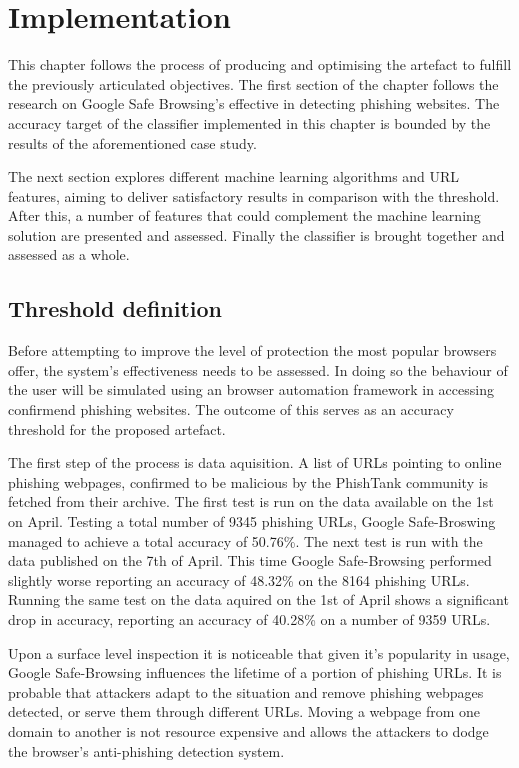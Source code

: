 
\chapter{Implementation}
This chapter follows the process of producing and optimising the artefact to fulfill the previously articulated objectives. The first section of the chapter follows the research on Google Safe Browsing's effective in detecting phishing websites. The accuracy target of the classifier implemented in this chapter is bounded by the results of the aforementioned case study. 

The next section explores different machine learning algorithms and URL features, aiming to deliver satisfactory results in comparison with the threshold. After this, a number of features that could complement the machine learning solution are presented and assessed. Finally the classifier is brought together and assessed as a whole.

\section{Threshold definition}
Before attempting to improve the level of protection the most popular browsers offer, the system's effectiveness needs to be assessed. In doing so the behaviour of the user will be simulated using an browser automation framework in accessing confirmend phishing websites. The outcome of this serves as an accuracy threshold for the proposed artefact.

The first step of the process is data aquisition. A list of URLs pointing to online phishing webpages, confirmed to be malicious by the PhishTank community is fetched from their archive. The first test is run on the data available on the 1st on April. Testing a total number of 9345 phishing URLs, Google Safe-Broswing managed to achieve a total accuracy of 50.76\%. 
The next test is run with the data published on the 7th of April. This time Google Safe-Browsing performed slightly worse reporting an accuracy of 48.32\% on the 8164 phishing URLs. Running the same test on the data aquired on the 1st of April shows a significant drop in accuracy, reporting an accuracy of 40.28\% on a number of 9359 URLs.

Upon a surface level inspection it is noticeable that given it's popularity in usage, Google Safe-Browsing influences the lifetime of a portion of phishing URLs. It is probable that attackers adapt to the situation and remove phishing webpages detected, or serve them through different URLs. Moving a webpage from one domain to another is not resource expensive and allows the attackers to dodge the browser's anti-phishing detection system.

